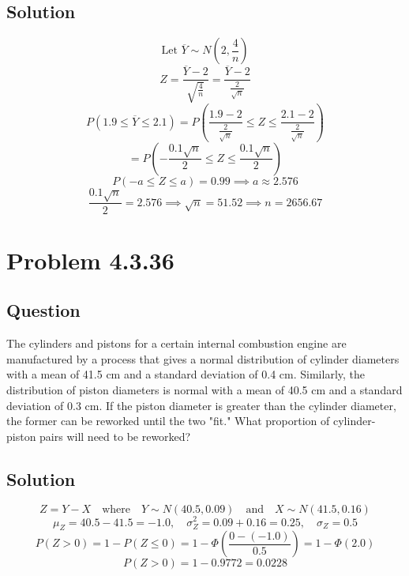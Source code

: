 \documentclass[12pt]{article}
\begin{document}
\subsection*{Solution}
\[
\text{Let } \overline{Y} \sim N\left(2, \frac{4}{n}\right)
\]
\[
Z = \frac{\overline{Y} - 2}{\sqrt{\frac{4}{n}}} = \frac{\overline{Y} - 2}{\frac{2}{\sqrt{n}}}
\]
\[
P\left(1.9 \leq \overline{Y} \leq 2.1\right) = P\left(\frac{1.9 - 2}{\frac{2}{\sqrt{n}}} \leq Z \leq \frac{2.1 - 2}{\frac{2}{\sqrt{n}}}\right)
\]
\[
= P\left(-\frac{0.1 \sqrt{n}}{2} \leq Z \leq \frac{0.1 \sqrt{n}}{2}\right)
\]
\[
P(-a \leq Z \leq a) = 0.99 \implies a \approx 2.576
\]
\[
\frac{0.1 \sqrt{n}}{2} = 2.576 \implies \sqrt{n} = 51.52 \implies n = 2656.67
\]

\newpage


\section*{Problem 4.3.36}
\subsection*{Question}
The cylinders and pistons for a certain internal combustion engine are manufactured by a process that gives a normal distribution of cylinder diameters with a mean of 41.5 cm and a standard deviation of 0.4 cm. Similarly, the distribution of piston diameters is normal with a mean of 40.5 cm and a standard deviation of 0.3 cm. If the piston diameter is greater than the cylinder diameter, the former can be reworked until the two "fit." What proportion of cylinder-piston pairs will need to be reworked?

\subsection*{Solution}
\[
Z = Y - X \quad \text{where} \quad Y \sim N(40.5, 0.09) \quad \text{and} \quad X \sim N(41.5, 0.16)
\]
\[
\mu_Z = 40.5 - 41.5 = -1.0, \quad \sigma_Z^2 = 0.09 + 0.16 = 0.25, \quad \sigma_Z = 0.5
\]
\[
P(Z > 0) = 1 - P(Z \leq 0) = 1 - \Phi\left(\frac{0 - (-1.0)}{0.5}\right) = 1 - \Phi(2.0)
\]
\[
P(Z > 0) = 1 - 0.9772 = 0.0228
\]
\newpage
\end{document}
